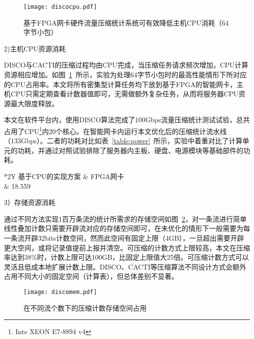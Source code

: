 \begin{figure}[!ht]
	\centering 
	\vspace{-1.5mm} 
	\texttt{[image: discocpu.pdf]}
	\caption{基于FPGA网卡硬件流量压缩统计系统可有效降低主机CPU消耗（64字节小包）} \label{fig:discocpu}
\end{figure}


2)主机CPU资源消耗

DISCO与CACTI的压缩过程均由CPU完成，当压缩任务请求频次增加，CPU计算资源相应增加。如图~\ref{fig:discocpu}~所示，实验为处理64字节小包时的最高性能情形下所对应的CPU占用率。本文将所有密集型计算任务均下放到基于FPGA的智能网卡，主机CPU只需定期查看计数器值即可，无需做额外复杂任务，从而将服务器CPU资源最大限度释放。

本文在软件平台内，使用DISCO算法完成了100Gbps流量压缩统计测试试验，总共占用了CPU\footnote{Inte XEON E7-8894 v4}内20个核心。在智能网卡内运行本文优化后的压缩统计流水线（133Gbps）。二者的功耗对比如表~\ref{table:power}~所示，实验中着重对比了计算单元的功耗，并通过对照试验排除了服务器内主板、硬盘、电源模块等基础部件的功耗。

\begin{table}[!ht]
	\renewcommand{\arraystretch}{1.2}
	\centering\wuhao
	\caption{不同平台下压缩统计功能功耗对比（单位：瓦特）} \label{table:power} \vspace{4mm}
	\begin{tabularx}{\textwidth}{*{2}Y}
		\toprule[1.5pt]
		基于CPU的实现方案 & FPGA网卡 \\
		 & 18.559\\
		\bottomrule[1.5pt]
	\end{tabularx}
\end{table}

3）存储资源消耗

通过不同方法实现1百万条流的统计所需求的存储空间如图~\ref{fig:discomem}，对一条流进行简单线性叠加计数只需要开辟流对应的存储空间即可，在未优化的情形下一般需要为每一条流开辟32bits计数空间，然而此空间有固定上限（4GB），一旦超出需要开辟更大空间，或将记录值提前上报并清空。可压缩的计数方式上限较高，本文在压缩率达到38\%时，计数上限可达100GB，比固定上限值大25倍。可压缩计数方式可以灵活且低成本地扩展计数上限。DISCO、CACTI等压缩算法不同设计方式会额外占用不同大小的固定空间（计算表），但总体差别不显著。

\begin{figure}[!ht]
	\centering 
	\vspace{-1.5mm} 
	\texttt{[image: discomem.pdf]}
	\caption{在不同流个数下的压缩计数存储空间占用} \label{fig:discomem}
\end{figure}



